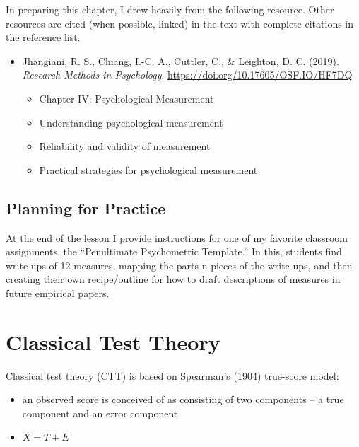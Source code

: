 \documentclass[
  english,
]{book}
\providecommand{\tightlist}{%
  \setlength{\itemsep}{0pt}\setlength{\parskip}{0pt}}
\begin{document}
In preparing this chapter, I drew heavily from the following resource. Other resources are cited (when possible, linked) in the text with complete citations in the reference list.

\begin{itemize}
\tightlist
\item
  Jhangiani, R. S., Chiang, I.-C. A., Cuttler, C., \& Leighton, D. C. (2019). \emph{Research Methods in Psychology}. \url{https://doi.org/10.17605/OSF.IO/HF7DQ}

  \begin{itemize}
  \tightlist
  \item
    Chapter IV: Psychological Measurement
  \item
    Understanding psychological measurement
  \item
    Reliability and validity of measurement
  \item
    Practical strategies for psychological measurement
  \end{itemize}
\end{itemize}

\hypertarget{planning-for-practice}{%
\subsection{Planning for Practice}\label{planning-for-practice}}

At the end of the lesson I provide instructions for one of my favorite classroom assignments, the ``Penultimate Psychometric Template.'' In this, students find write-ups of 12 measures, mapping the parts-n-pieces of the write-ups, and then creating their own recipe/outline for how to draft descriptions of measures in future empirical papers.

\hypertarget{classical-test-theory}{%
\section{Classical Test Theory}\label{classical-test-theory}}

Classical test theory (CTT) is based on Spearman's (1904) true-score model:

\begin{itemize}
\tightlist
\item
  an observed score is conceived of as consisting of two components -- a true component and an error component
\item
  \(X = T + E\)
\end{itemize}
\end{document}
